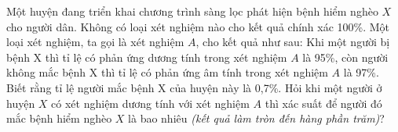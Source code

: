 \begin{bt}%
	Một huyện đang triển khai chương trình sàng lọc phát hiện bệnh hiểm nghèo $X$ cho người dân. Không có loại xét nghiệm nào cho kết quả chính xác 100\%. Một loại xét nghiệm, ta gọi là xét nghiệm $A$, cho kết quả như sau: Khi một người bị bệnh X thì tỉ lệ có phản ứng dương tính trong xét nghiệm $A$ là 95\%, còn người không mắc bệnh X thì tỉ lệ có phản ứng âm tính trong xét nghiệm $A$ là 97\%. Biết rằng tỉ lệ người mắc bệnh X của huyện này là 0{,}7\%. Hỏi khi một người ở huyện  $X$ có xét nghiệm dương tính với xét nghiệm $A$ thì xác suất để người đó mắc bệnh hiểm nghèo $X$ là bao nhiêu \textit{(kết quả làm tròn đến hàng phần trăm)}?
\end{bt}

